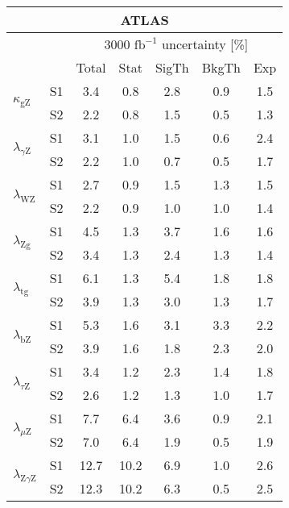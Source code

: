 \begin{tabular}{@{} l c c@{\hskip 0.15in} c c c c @{}}
  \hline
     \multicolumn{7}{c}{ATLAS}\\
 \hline
  &  & \multicolumn{5}{c}{3000 $\text{fb}^{-1}$ uncertainty [\%]} \\
  &  & Total & Stat & SigTh & BkgTh & Exp \\
  \hline
  \multirow{2}{*}{$\kappa_{\mathrm{gZ}}$} & S1 & 3.4   & 0.8   & 2.8   & 0.9   & 1.5  \\[1pt] 
  & S2 & 2.2   & 0.8   & 1.5   & 0.5   & 1.3  \\[4pt]  
  \multirow{2}{*}{$\lambda_{\gamma\mathrm{Z}}$} & S1 & 3.1   & 1.0   & 1.5   & 0.6   & 2.4  \\[1pt]
  & S2  & 2.2   & 1.0   & 0.7   & 0.5   & 1.7  \\[4pt]
  \multirow{2}{*}{$\lambda_{\mathrm{WZ}}$} & S1 & 2.7   & 0.9   & 1.5   & 1.3   & 1.5  \\[1pt]
  & S2  & 2.2   & 0.9   & 1.0   & 1.0   & 1.4  \\[4pt]
  \multirow{2}{*}{$\lambda_{\mathrm{Zg}}$} & S1 & 4.5   & 1.3   & 3.7   & 1.6   & 1.6  \\[1pt]
  & S2  & 3.4   & 1.3   & 2.4   & 1.3   & 1.4  \\[4pt]
  \multirow{2}{*}{$\lambda_{\mathrm{tg}}$} & S1 & 6.1   & 1.3   & 5.4   & 1.8   & 1.8  \\[1pt]
  & S2  & 3.9   & 1.3   & 3.0   & 1.3   & 1.7  \\[4pt]
  \multirow{2}{*}{$\lambda_{\mathrm{bZ}}$} & S1 & 5.3   & 1.6   & 3.1   & 3.3   & 2.2  \\[1pt]
  & S2  & 3.9   & 1.6   & 1.8   & 2.3   & 2.0  \\[4pt]
  \multirow{2}{*}{$\lambda_{\tau\mathrm{Z}}$} & S1 & 3.4   & 1.2   & 2.3   & 1.4   & 1.8  \\[1pt]
  & S2  & 2.6   & 1.2   & 1.3   & 1.0   & 1.7  \\[4pt]
  \multirow{2}{*}{$\lambda_{\mu\mathrm{Z}}$} & S1 & 7.7   & 6.4   & 3.6   & 0.9   & 2.1  \\[1pt]
  & S2  & 7.0   & 6.4   & 1.9   & 0.5   & 1.9  \\[4pt]
  \multirow{2}{*}{$\lambda_{\mathrm{Z}\gamma\mathrm{Z}}$} & S1 & 12.7  & 10.2  & 6.9   & 1.0   & 2.6  \\[1pt]
  & S2  & 12.3  & 10.2  & 6.3   & 0.5   & 2.5  \\[4pt]
  \hline
\end{tabular}
